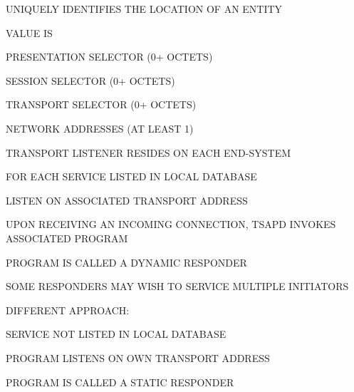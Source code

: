 \begin{bwslide}

\begin{nrtc}
\item	UNIQUELY IDENTIFIES THE LOCATION OF AN ENTITY
\item	VALUE IS
	\begin{nrtc}
	\item	PRESENTATION SELECTOR (0+ OCTETS)
	\item	SESSION SELECTOR (0+ OCTETS)
	\item	TRANSPORT SELECTOR (0+ OCTETS)
	\item	NETWORK ADDRESSES (AT LEAST 1)
	\end{nrtc}
\end{nrtc}
\end{bwslide}


\begin{bwslide}

\begin{nrtc}
\item	TRANSPORT LISTENER RESIDES ON EACH END-SYSTEM
\item	FOR EACH SERVICE LISTED IN LOCAL DATABASE
	\begin{nrtc}
	\item	LISTEN ON ASSOCIATED TRANSPORT ADDRESS
	\item	UPON RECEIVING AN INCOMING CONNECTION, TSAPD
		INVOKES ASSOCIATED PROGRAM
	\end{nrtc}
\item	PROGRAM IS CALLED A DYNAMIC RESPONDER
\end{nrtc}
\end{bwslide}


\begin{bwslide}

\begin{nrtc}
\item	SOME RESPONDERS MAY WISH TO SERVICE MULTIPLE INITIATORS
\item	DIFFERENT APPROACH:
	\begin{nrtc}
	\item	SERVICE NOT LISTED IN LOCAL DATABASE
	\item	PROGRAM LISTENS ON OWN TRANSPORT ADDRESS
	\end{nrtc}
\item	PROGRAM IS CALLED A STATIC RESPONDER
\end{nrtc}
\end{bwslide}


